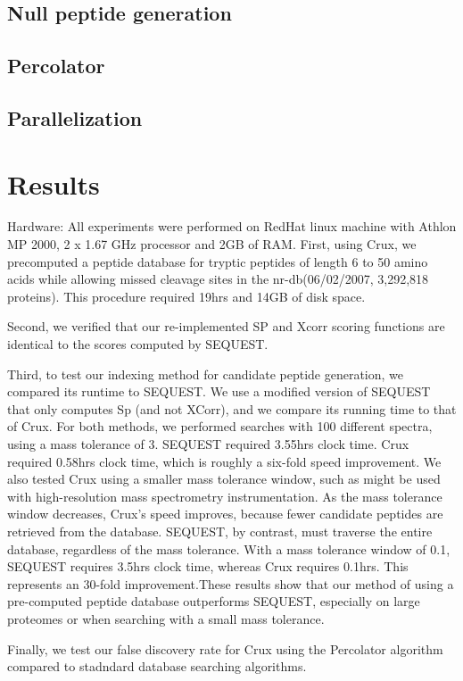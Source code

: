 \documentclass{bioinfo}
\begin{document}
\subsection*{Null peptide generation}
\subsection*{Percolator}
\subsection*{Parallelization}

\section{Results}

Hardware: All experiments were performed on RedHat linux machine with
Athlon MP 2000, 2 x 1.67 GHz processor and 2GB of RAM.  First, using
Crux, we precomputed a peptide database for tryptic peptides of length
6 to 50 amino acids while allowing missed cleavage sites in the
nr-db(06/02/2007, 3,292,818 proteins). This procedure required 19hrs
and 14GB of disk space.

Second, we verified that our re-implemented SP and Xcorr scoring
functions are identical to the scores computed by SEQUEST.

Third, to test our indexing method for candidate peptide generation,
we compared its runtime to SEQUEST.  We use a modified version of
SEQUEST that only computes Sp (and not XCorr), and we compare its
running time to that of Crux.  For both methods, we performed searches
with 100 different spectra, using a mass tolerance of 3.  SEQUEST
required 3.55hrs clock time. Crux required 0.58hrs clock time, which
is roughly a six-fold speed improvement. We also tested Crux using a
smaller mass tolerance window, such as might be used with
high-resolution mass spectrometry instrumentation.  As the mass
tolerance window decreases, Crux's speed improves, because fewer
candidate peptides are retrieved from the database.  SEQUEST, by
contrast, must traverse the entire database, regardless of the mass
tolerance.  With a mass tolerance window of 0.1, SEQUEST requires
3.5hrs clock time, whereas Crux requires 0.1hrs.  This represents an
30-fold improvement.These results show that our method of using a
pre-computed peptide database outperforms SEQUEST, especially on large
proteomes or when searching with a small mass tolerance.

Finally, we test our false discovery rate for Crux using the
Percolator algorithm compared to stadndard database searching
algorithms.
\end{document}
